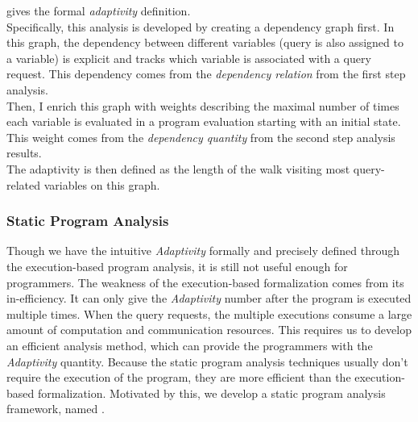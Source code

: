 \begin{enumerate}
 gives the formal \emph{adaptivity} definition. 
 \\
 Specifically, this analysis is developed by creating a dependency graph first. 
 In this graph, the dependency between different variables (query is also assigned to a variable) 
 is explicit and tracks which variable is associated with a query request. 
 This dependency comes from the \emph{dependency relation} from the first step analysis.
 \\
 Then, I enrich this graph with 
 weights describing the maximal number of times each variable is evaluated in a program evaluation starting with an initial state. 
 This weight comes from the \emph{dependency quantity} from the second step analysis results.
 \\
 The adaptivity is then defined as the length of the walk visiting most query-related variables on this graph. 
 \end{enumerate}
\subsubsection{Static Program Analysis}
\label{sec:intro-static}
%
Though we have the intuitive \emph{Adaptivity} formally and precisely defined through the execution-based program analysis,
it is still not useful enough for programmers.
The weakness of the execution-based formalization comes from its in-efficiency.
It can only give the \emph{Adaptivity} number
after the program is executed multiple times.
When the query requests, the multiple executions consume a large amount of computation and communication resources.
This requires us to develop an efficient analysis method, 
which can provide the programmers with the \emph{Adaptivity} quantity.
Because the static program analysis techniques usually don't require the execution of the program,
they are more efficient than the execution-based formalization.
Motivated by this, we develop a static program analysis framework, named {\THESYSTEM}.
